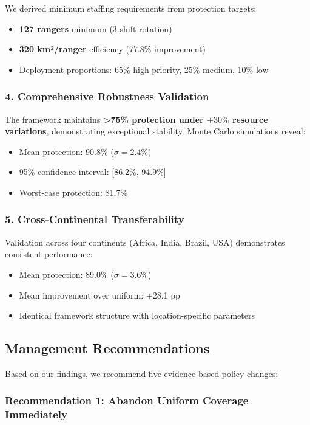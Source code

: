 We derived minimum staffing requirements from protection targets:
\begin{itemize}
    \item \textbf{127 rangers} minimum (3-shift rotation)
    \item \textbf{320 km²/ranger} efficiency (77.8\% improvement)
    \item Deployment proportions: 65\% high-priority, 25\% medium, 10\% low
\end{itemize}

\subsubsection{4. Comprehensive Robustness Validation}

The framework maintains \textbf{>75\% protection under $\pm30\%$ resource variations}, demonstrating exceptional stability. Monte Carlo simulations reveal:
\begin{itemize}
    \item Mean protection: 90.8\% ($\sigma = 2.4\%$)
    \item 95\% confidence interval: [86.2\%, 94.9\%]
    \item Worst-case protection: 81.7\%
\end{itemize}

\subsubsection{5. Cross-Continental Transferability}

Validation across four continents (Africa, India, Brazil, USA) demonstrates consistent performance:
\begin{itemize}
    \item Mean protection: 89.0\% ($\sigma = 3.6\%$)
    \item Mean improvement over uniform: +28.1 pp
    \item Identical framework structure with location-specific parameters
\end{itemize}

\subsection{Management Recommendations}

Based on our findings, we recommend five evidence-based policy changes:

\subsubsection{Recommendation 1: Abandon Uniform Coverage Immediately}

